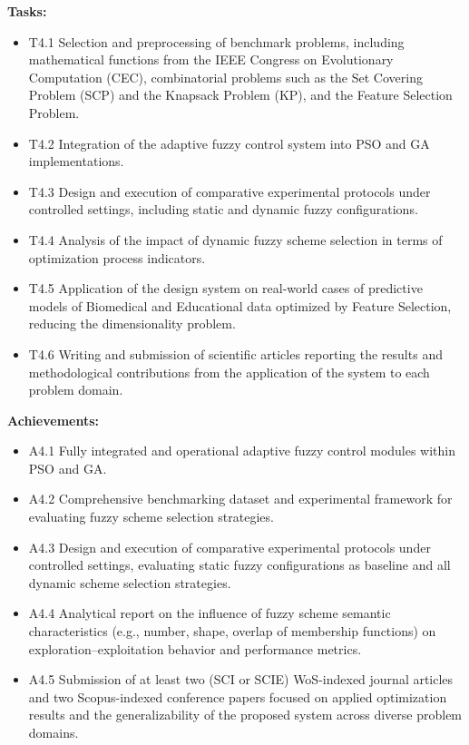 \textbf{Tasks:}
\begin{itemize}
    \item T4.1 Selection and preprocessing of benchmark problems, including mathematical functions from the IEEE Congress on Evolutionary Computation (CEC), combinatorial problems such as the Set Covering Problem (SCP) and the Knapsack Problem (KP), and the Feature Selection Problem.
    \item T4.2 Integration of the adaptive fuzzy control system into PSO and GA implementations.
    \item T4.3 Design and execution of comparative experimental protocols under controlled settings, including static and dynamic fuzzy configurations.
    \item T4.4 Analysis of the impact of dynamic fuzzy scheme selection in terms of optimization process indicators.
    \item T4.5 Application of the design system on real-world cases of predictive models of Biomedical and Educational data optimized by Feature Selection, reducing the dimensionality problem.
    \item T4.6 Writing and submission of scientific articles reporting the results and methodological contributions from the application of the system to each problem domain.
\end{itemize}

\textbf{Achievements:}
\begin{itemize}
    \item A4.1 Fully integrated and operational adaptive fuzzy control modules within PSO and GA.
    \item A4.2 Comprehensive benchmarking dataset and experimental framework for evaluating fuzzy scheme selection strategies.
    \item A4.3 Design and execution of comparative experimental protocols under controlled settings, evaluating static fuzzy configurations as baseline and all dynamic scheme selection strategies.
    \item A4.4 Analytical report on the influence of fuzzy scheme semantic characteristics (e.g., number, shape, overlap of membership functions) on exploration–exploitation behavior and performance metrics.
    \item A4.5 Submission of at least two (SCI or SCIE) WoS-indexed journal articles and two Scopus-indexed conference papers focused on applied optimization results and the generalizability of the proposed system across diverse problem domains.
\end{itemize}

